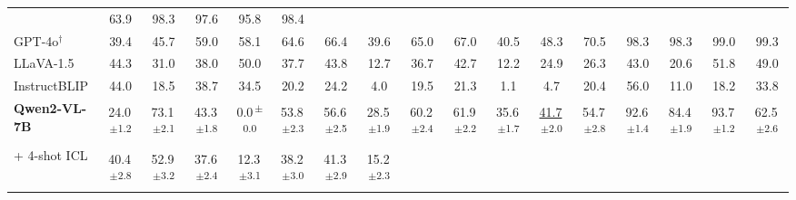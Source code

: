 \documentclass[sigconf,review,anonymous,9pt,table]{acmart}
\begin{document}
\begin{table}[t]
{\begin{tabular}{@{}l
  c c
  c c c c c
  c c c c
  c c c c c
  @{}}
  & \cellcolor{gray!15}63.9 & \cellcolor{gray!15}98.3 & \cellcolor{gray!15}97.6 & \cellcolor{gray!15}95.8 & \cellcolor{gray!15}98.4 \\
\cellcolor{gray!15}GPT-4o$^\dagger$
  & \cellcolor{gray!15}39.4 & \cellcolor{gray!15}45.7 & \cellcolor{gray!15}59.0 & \cellcolor{gray!15}58.1 & \cellcolor{gray!15}64.6 & \cellcolor{gray!15}66.4 & \cellcolor{gray!15}39.6
  & \cellcolor{gray!15}65.0 & \cellcolor{gray!15}67.0 & \cellcolor{gray!15}40.5 & \cellcolor{gray!15}48.3
  & \cellcolor{gray!15}70.5 & \cellcolor{gray!15}98.3 & \cellcolor{gray!15}98.3 & \cellcolor{gray!15}99.0 & \cellcolor{gray!15}99.3 \\
\cellcolor{gray!15}LLaVA-1.5
  & \cellcolor{gray!15}44.3 & \cellcolor{gray!15}31.0 & \cellcolor{gray!15}38.0 & \cellcolor{gray!15}50.0 & \cellcolor{gray!15}37.7 & \cellcolor{gray!15}43.8 & \cellcolor{gray!15}12.7
  & \cellcolor{gray!15}36.7 & \cellcolor{gray!15}42.7 & \cellcolor{gray!15}12.2 & \cellcolor{gray!15}24.9
  & \cellcolor{gray!15}26.3 & \cellcolor{gray!15}43.0 & \cellcolor{gray!15}20.6 & \cellcolor{gray!15}51.8 & \cellcolor{gray!15}49.0 \\
\cellcolor{gray!15}InstructBLIP
  & \cellcolor{gray!15}44.0 & \cellcolor{gray!15}18.5 & \cellcolor{gray!15}38.7 & \cellcolor{gray!15}34.5 & \cellcolor{gray!15}20.2 & \cellcolor{gray!15}24.2 & \cellcolor{gray!15}4.0
  & \cellcolor{gray!15}19.5 & \cellcolor{gray!15}21.3 & \cellcolor{gray!15}1.1 & \cellcolor{gray!15}4.7
  & \cellcolor{gray!15}20.4 & \cellcolor{gray!15}56.0 & \cellcolor{gray!15}11.0 & \cellcolor{gray!15}18.2 & \cellcolor{gray!15}33.8 \\
\midrule
\textbf{Qwen2-VL-7B}
  & 24.0\textsuperscript{\,$\pm$1.2} & 73.1\textsuperscript{\,$\pm$2.1} & 43.3\textsuperscript{\,$\pm$1.8} & 0.0\textsuperscript{\,$\pm$0.0} & 53.8\textsuperscript{\,$\pm$2.3} & 56.6\textsuperscript{\,$\pm$2.5} & 28.5\textsuperscript{\,$\pm$1.9}
  & 60.2\textsuperscript{\,$\pm$2.4} & 61.9\textsuperscript{\,$\pm$2.2} & 35.6\textsuperscript{\,$\pm$1.7} & \underline{41.7}\textsuperscript{\,$\pm$2.0}
  & 54.7\textsuperscript{\,$\pm$2.8} & 92.6\textsuperscript{\,$\pm$1.4} & 84.4\textsuperscript{\,$\pm$1.9} & 93.7\textsuperscript{\,$\pm$1.2} & 62.5\textsuperscript{\,$\pm$2.6} \\
+ 4-shot ICL
  & 40.4\textsuperscript{\,$\pm$2.8} & 52.9\textsuperscript{\,$\pm$3.2} & 37.6\textsuperscript{\,$\pm$2.4} & 12.3\textsuperscript{\,$\pm$3.1} & 38.2\textsuperscript{\,$\pm$3.0} & 41.3\textsuperscript{\,$\pm$2.9} & 15.2\textsuperscript{\,$\pm$2.3}

\end{tabular}}
\end{table}
\end{document}
